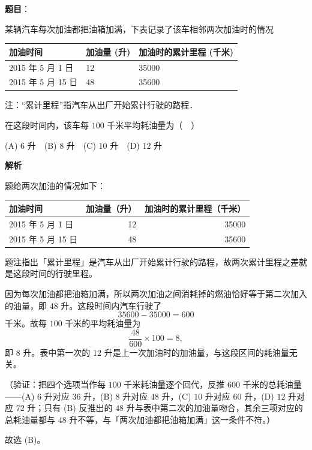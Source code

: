 \begin{answer}

\textbf{题目}：

某辆汽车每次加油都把油箱加满，下表记录了该车相邻两次加油时的情况

\begin{center}
\begin{tabular}{lll}
\toprule
加油时间 & 加油量 (升) & 加油时的累计里程 (千米) \\
\midrule
2015 年 5 月 1 日 & 12 & 35000 \\
2015 年 5 月 15 日 & 48 & 35600 \\
\bottomrule
\end{tabular}
\end{center}

注：“累计里程”指汽车从出厂开始累计行驶的路程．

在这段时间内，该车每 \(100\) 千米平均耗油量为（　）

(A) \(6\) 升　(B) \(8\) 升　(C) \(10\) 升　(D) \(12\) 升

\textbf{解析}

题给两次加油的情况如下：

\begin{center}
\begin{tabular}{lrr}
\toprule
加油时间 & 加油量（升） & 加油时的累计里程（千米） \\
\midrule
2015 年 5 月 1 日 & 12 & 35000 \\
2015 年 5 月 15 日 & 48 & 35600 \\
\bottomrule
\end{tabular}
\end{center}

题注指出「累计里程」是汽车从出厂开始累计行驶的路程，故两次累计里程之差就是这段时间的行驶里程。

因为每次加油都把油箱加满，所以两次加油之间消耗掉的燃油恰好等于第二次加入的油量，即 \(48\) 升。这段时间内汽车行驶了
\nopagebreak[4]
\[
35600-35000=600
\]
千米。故每 \(100\) 千米的平均耗油量为
\nopagebreak[4]
\[
\frac{48}{600}\times100=8,
\]
即 \(8\) 升。表中第一次的 \(12\) 升是上一次加油时的加油量，与这段区间的耗油量无关。

（验证：把四个选项当作每 \(100\) 千米耗油量逐个回代，反推 \(600\) 千米的总耗油量——(A) \(6\) 升对应 \(36\) 升，(B) \(8\) 升对应 \(48\) 升，(C) \(10\) 升对应 \(60\) 升，(D) \(12\) 升对应 \(72\) 升；只有 (B) 反推出的 \(48\) 升与表中第二次的加油量吻合，其余三项对应的总耗油量都与 \(48\) 升不等，与「两次加油都把油箱加满」这一条件不符。）

故选 (B)。


\end{answer}
